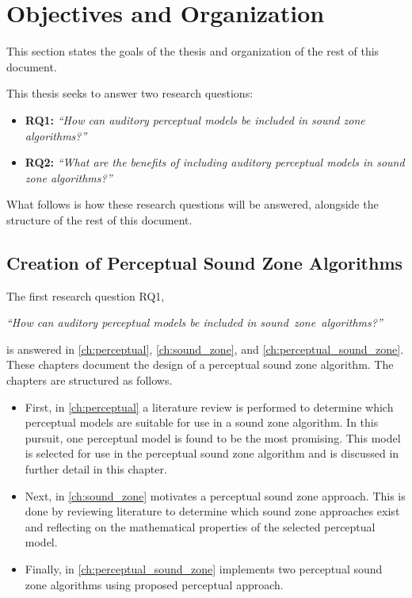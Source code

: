 \section{Objectives and Organization}
\label{ch:introduction:objectives}
This section states the goals of the thesis and organization of the rest of this document.

This thesis seeks to answer two research questions:
\begin{itemize}
    \item \textbf{RQ1:} {\textit{``How can auditory perceptual models be included in sound zone algorithms?''}}
    \item \textbf{RQ2:} {\textit{``What are the benefits of including auditory perceptual models in sound zone algorithms?''}}
\end{itemize}

What follows is how these research questions will be answered, alongside the structure of the rest of this document.

\subsection{Creation of Perceptual Sound Zone Algorithms}
The first research question RQ1, 

\begin{center}
    {\textit{``How can auditory perceptual models be included in sound~zone~algorithms?''}}
\end{center}

is answered in \autoref{ch:perceptual}, \autoref{ch:sound_zone}, and \autoref{ch:perceptual_sound_zone}.
These chapters document the design of a perceptual sound zone algorithm.
The chapters are structured as follows.
\begin{itemize}
    \item First, in \autoref{ch:perceptual} a literature review is performed to determine which perceptual models are suitable for use in a 
        sound zone algorithm.
        In this pursuit, one perceptual model is found to be the most promising.
        This model is selected for use in the perceptual sound zone algorithm and is discussed in further detail in this chapter.
    \item Next, in \autoref{ch:sound_zone} motivates a perceptual sound zone approach.
        This is done by reviewing literature to determine which sound zone approaches exist 
        and reflecting on the mathematical properties of the selected perceptual model.
    \item Finally, in \autoref{ch:perceptual_sound_zone} implements two perceptual sound zone algorithms using proposed perceptual approach.
\end{itemize}

